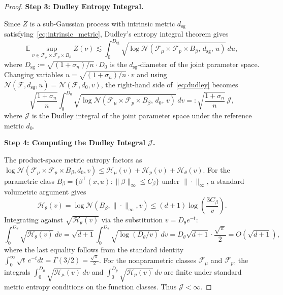 \begin{proof}
\noindent\textbf{Step 3: Dudley Entropy Integral.}

Since $Z$ is a sub-Gaussian process with intrinsic metric $d_{\mathrm{sg}}$ satisfying~\eqref{eq:intrinsic_metric}, Dudley's entropy integral theorem gives
\begin{equation}\label{eq:dudley}
\mathbb{E}\!\sup_{\nu\in\mathcal{F}_\mu\times\mathcal{F}_p\times B_\beta} Z(\nu) \lesssim \int_0^{D_{\mathrm{sg}}} \sqrt{\log\mathcal{N}\!\left(\mathcal{F}_\mu\times\mathcal{F}_p\times B_\beta,\,d_{\mathrm{sg}},\,u\right)}\,du,
\end{equation}
where $D_{\mathrm{sg}}:=\sqrt{(1+\sigma_n)/n}\cdot D_0$ is the $d_{\mathrm{sg}}$-diameter of the joint parameter space. Changing variables $u=\sqrt{(1+\sigma_n)/n}\cdot v$ and using $\mathcal{N}(\mathcal{F},d_{\mathrm{sg}},u)=\mathcal{N}(\mathcal{F},d_0,v)$, the right-hand side of~\eqref{eq:dudley} becomes
\begin{equation}\label{eq:dudley_reparameterized}
\sqrt{\frac{1+\sigma_n}{n}}\int_0^{D_0}\sqrt{\log\mathcal{N}(\mathcal{F}_\mu\times\mathcal{F}_p\times B_\beta,\,d_0,\,v)}\,dv =: \sqrt{\frac{1+\sigma_n}{n}}\,\mathcal{J},
\end{equation}
where $\mathcal{J}$ is the Dudley integral of the joint parameter space under the reference metric $d_0$.

\noindent\textbf{Step 4: Computing the Dudley Integral $\mathcal{J}$.}

The product-space metric entropy factors as $\log\mathcal{N}(\mathcal{F}_\mu\times\mathcal{F}_p\times B_\beta,d_0,v)\leq\mathcal{H}_\mu(v)+\mathcal{H}_p(v)+\mathcal{H}_\theta(v)$. For the parametric class $B_\beta=\{\beta^\top(x,u):\|\beta\|_\infty\leq C_\beta\}$ under $\|\cdot\|_\infty$, a standard volumetric argument gives
$$\mathcal{H}_\theta(v) = \log\mathcal{N}(B_\beta,\|\cdot\|_\infty,v) \leq (d+1)\log\!\left(\frac{3C_\beta}{v}\right).$$
Integrating against $\sqrt{\mathcal{H}_\theta(v)}$ via the substitution $v=D_\theta e^{-t}$:
\begin{equation}\label{eq:dudley_theta}
\int_0^{D_\theta}\sqrt{\mathcal{H}_\theta(v)}\,dv = \sqrt{d+1}\int_0^{D_\theta}\sqrt{\log(D_\theta/v)}\,dv = D_\theta\sqrt{d+1}\cdot\frac{\sqrt{\pi}}{2} = O\!\left(\sqrt{d+1}\right),
\end{equation}
where the last equality follows from the standard identity $\int_0^\infty\sqrt{t}\,e^{-t}dt=\Gamma(3/2)=\frac{\sqrt{\pi}}{2}$. For the nonparametric classes $\mathcal{F}_\mu$ and $\mathcal{F}_p$, the integrals $\int_0^{D_\mu}\sqrt{\mathcal{H}_\mu(v)}\,dv$ and $\int_0^{D_p}\sqrt{\mathcal{H}_p(v)}\,dv$ are finite under standard metric entropy conditions on the function classes. Thus $\mathcal{J}<\infty$.


\end{proof}
